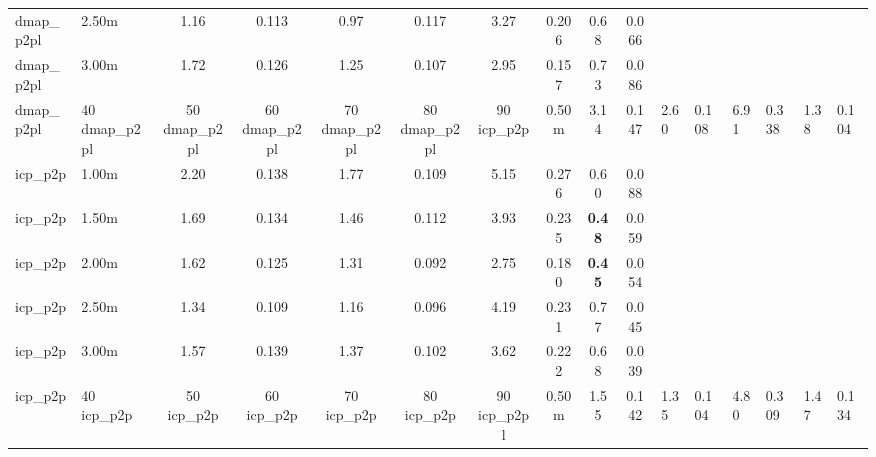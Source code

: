 \begin{tabular}{llcccccccc}
dmap\_p2pl & 2.50m & 1.16 & 0.113 & 0.97 & 0.117 & 3.27 & 0.206 & 0.68 & 0.066 \\
dmap\_p2pl & 3.00m & 1.72 & 0.126 & 1.25 & 0.107 & 2.95 & 0.157 & 0.73 & 0.086 \\
dmap\_p2pl & 40%
dmap\_p2pl & 50%
dmap\_p2pl & 60%
dmap\_p2pl & 70%
dmap\_p2pl & 80%
dmap\_p2pl & 90%
\midrule
icp\_p2p & 0.50m & 3.14 & 0.147 & 2.60 & 0.108 & 6.91 & 0.338 & 1.38 & 0.104 \\
icp\_p2p & 1.00m & 2.20 & 0.138 & 1.77 & 0.109 & 5.15 & 0.276 & 0.60 & 0.088 \\
icp\_p2p & 1.50m & 1.69 & 0.134 & 1.46 & 0.112 & 3.93 & 0.235 & \bfseries 0.48 & 0.059 \\
icp\_p2p & 2.00m & 1.62 & 0.125 & 1.31 & 0.092 & 2.75 & 0.180 & \bfseries 0.45 & 0.054 \\
icp\_p2p & 2.50m & 1.34 & 0.109 & 1.16 & 0.096 & 4.19 & 0.231 & 0.77 & 0.045 \\
icp\_p2p & 3.00m & 1.57 & 0.139 & 1.37 & 0.102 & 3.62 & 0.222 & 0.68 & 0.039 \\
icp\_p2p & 40%
icp\_p2p & 50%
icp\_p2p & 60%
icp\_p2p & 70%
icp\_p2p & 80%
icp\_p2p & 90%
\midrule
icp\_p2pl & 0.50m & 1.55 & 0.142 & 1.35 & 0.104 & 4.80 & 0.309 & 1.47 & 0.134 \\

\end{tabular}

